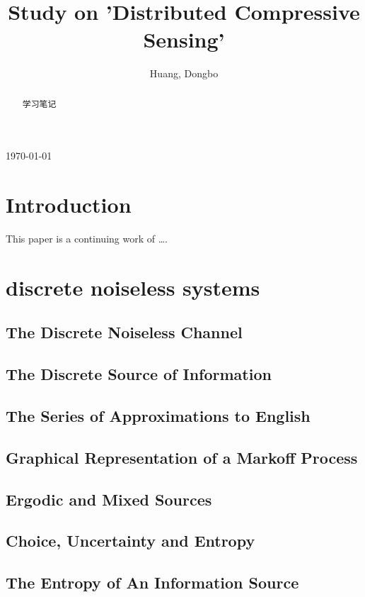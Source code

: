\documentclass[conference]{IEEEtran}
\title{Study on 'Distributed Compressive Sensing'}
\author{Huang, Dongbo}
\begin{document}
	
	
\theoremstyle{plain} \newtheorem{theorem}{Theorem}
\newtheorem{remark}{Remark}
\maketitle
\today



\begin{abstract}
学习笔记
\end{abstract}

\section{Introduction}
This paper is a continuing work of \ldots.
\section{discrete noiseless systems}
\subsection{The Discrete Noiseless Channel}
\subsection{The Discrete Source of Information}
\subsection{The Series of Approximations to English}
\subsection{Graphical Representation of a Markoff Process}
\subsection{Ergodic and Mixed Sources}
\subsection{Choice, Uncertainty and Entropy}
\subsection{The Entropy of An Information Source}
\end{document}
